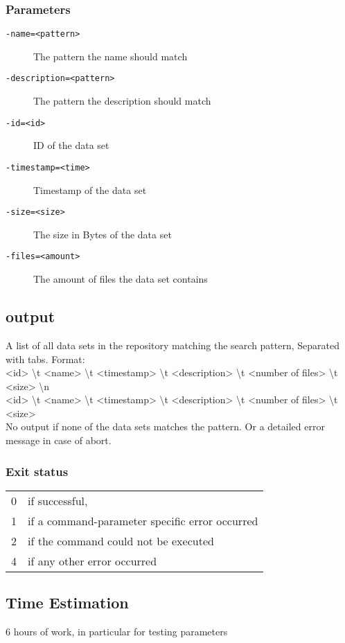 \documentclass{article} %
\begin{document}
		\subsubsection*{Parameters}
		\begin{description}
			\item[\texttt{-name=<pattern>}] The pattern the name should match
			\item[\texttt{-description=<pattern>}] The pattern the description should match
			\item[\texttt{-id=<id>}] ID of the data set
			\item[\texttt{-timestamp=<time>}] Timestamp of the data set
			\item[\texttt{-size=<size>}] The size in Bytes of the data set
			\item[\texttt{-files=<amount>}] The amount of files the data set contains
		\end{description}
		\subsection*{output}
		A list of all data sets in the repository matching the search pattern, Separated with tabs. Format:\\<id> \textbackslash t <name> \textbackslash t <timestamp> \textbackslash t <description> \textbackslash t <number of files> \textbackslash t <size> \textbackslash n \\<id> \textbackslash t <name> \textbackslash t <timestamp> \textbackslash t <description> \textbackslash t <number of files> \textbackslash t <size>\\
		No output if none of the data sets matches the pattern.
		Or a detailed error message in case of abort.
		\subsubsection*{Exit status}
		\begin{tabular}{ll}
			0 &  if successful,\\ 
			1 &  if a command-parameter specific error occurred\\
			2 &  if the command could not be executed\\
			4 &  if any other error occurred\\
		\end{tabular}
				\subsection*{Time Estimation}
				6 hours of work, in particular for testing parameters\\
				\noindent
		\newpage
\end{document}
